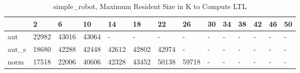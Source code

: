 \begin{table}
\caption{simple_robot, Maximum Resident Size in K to Compute LTL}
\label{simple_robot_LTL_size}
\begin{tabular}{llllllllllllll}
\toprule
 & 2 & 6 & 10 & 14 & 18 & 22 & 26 & 30 & 34 & 38 & 42 & 46 & 50 \\
\midrule
aut & 22982 & 43016 & 43064 & - & - & - & - & - & - & - & - & - & - \\
aut_s & 18680 & 42288 & 42448 & 42612 & 42802 & 42974 & - & - & - & - & - & - & - \\
norm & 17518 & 22006 & 40606 & 42328 & 43452 & 50138 & 59718 & - & - & - & - & - & - \\
\bottomrule
\end{tabular}
\end{table}
